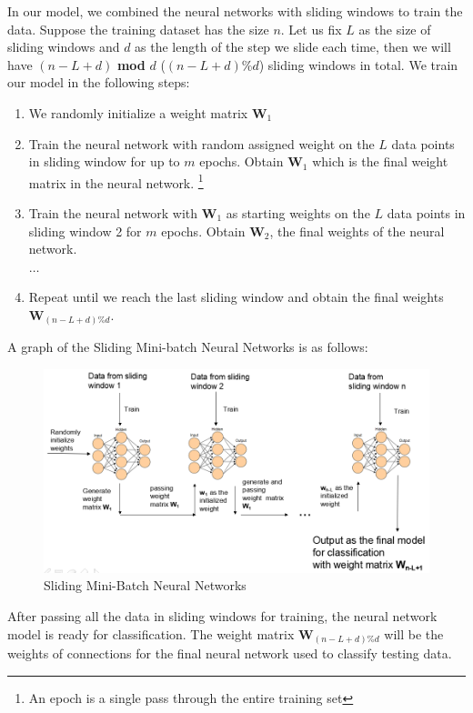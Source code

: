 \documentclass[conference]{IEEEtran}
\begin{document}
In our model, we combined the neural networks with sliding windows to train the data. Suppose the training dataset has the size $n$. Let us fix $L$ as the size of sliding windows and $d$ as the length of the step we slide each time, then we will have $(n-L+d)$ \textbf{mod} $d$ ($(n-L+d)\%d$) sliding windows in total. We train our model in the following steps: 
\begin{enumerate}
	\item We randomly initialize a weight matrix $\textbf{W}_1$
	\item Train the neural network with random assigned weight on the $L$ data points in sliding window for up to $m$ epochs. Obtain $\textbf{W}_1$ which is the final weight matrix in the neural network.
	\footnote{An epoch is a single pass through the entire training set} 
	\item Train the neural network with $\textbf{W}_1$ as starting weights on the $L$ data points in sliding window 2 for $m$ epochs. Obtain $\textbf{W}_2$, the final weights of the neural network.\\
	$\ldots$
	\item Repeat until we reach the last sliding window and obtain the final weights $\textbf{W}_{(n-L+d)\%d}$.
\end{enumerate}
A graph of the Sliding Mini-batch Neural Networks is as follows:
\begin{figure}[H]
	\centering
	\includegraphics[width=1\linewidth]{figures/CNN}
	\caption{Sliding Mini-Batch Neural Networks}
	\label{fig:minibatchANN}
\end{figure}
After passing all the data in sliding windows for training, the neural network model is ready for classification. The weight matrix $\textbf{W}_{(n-L+d)\%d}$ will be the weights of connections for the final neural network used to classify testing data.
\end{document}
